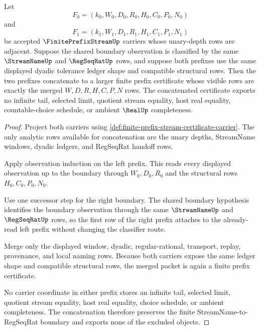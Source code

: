 \begin{theorem}
\label{thm:finite-prefix-stream-certificate-prefix-concatenation}
Let
$$
F_0=(k_0,W_0,D_0,R_0,H_0,C_0,P_0,N_0)
$$
and
$$
F_1=(k_1,W_1,D_1,R_1,H_1,C_1,P_1,N_1)
$$
be accepted $\FinitePrefixStreamUp$ carriers whose unary-depth rows are adjacent. Suppose the shared boundary observation is classified by the same $\StreamNameUp$ and $\RegSeqRatUp$ rows, and suppose both prefixes use the same displayed dyadic tolerance ledger shape and compatible structural rows. Then the two prefixes concatenate to a larger finite prefix certificate whose visible rows are exactly the merged $W,D,R,H,C,P,N$ rows. The concatenated certificate exports no infinite tail, selected limit, quotient stream equality, host real equality, countable-choice schedule, or ambient $\RealUp$ completeness.
\end{theorem}
\begin{proof}
Project both carriers using \autoref{def:finite-prefix-stream-certificate-carrier}. The only analytic rows available for concatenation are the unary depths, StreamName windows, dyadic ledgers, and RegSeqRat handoff rows.

Apply observation induction on the left prefix. This reads every displayed observation up to the boundary through $W_0,D_0,R_0$ and the structural rows $H_0,C_0,P_0,N_0$.

Use one successor step for the right boundary. The shared boundary hypothesis identifies the boundary observation through the same $\StreamNameUp$ and $\RegSeqRatUp$ rows, so the first row of the right prefix attaches to the already-read left prefix without changing the classifier route.

Merge only the displayed window, dyadic, regular-rational, transport, replay, provenance, and local naming rows. Because both carriers expose the same ledger shape and compatible structural rows, the merged packet is again a finite prefix certificate.

No carrier coordinate in either prefix stores an infinite tail, selected limit, quotient stream equality, host real equality, choice schedule, or ambient completeness. The concatenation therefore preserves the finite StreamName-to-RegSeqRat boundary and exports none of the excluded objects.
\end{proof}

